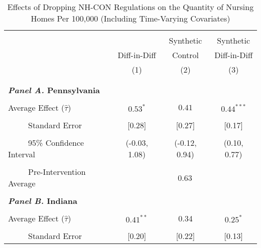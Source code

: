 \documentclass[12pt]{article}
\begin{document}
\vfill
\begin{table}[htbp]\centering \footnotesize
\def\sym#1{\ifmmode^{#1}\else\(^{#1}\)\fi}
\captionsetup{width=.69\textwidth}
\caption{\centering Effects of Dropping NH-CON Regulations on the Quantity of Nursing Homes Per 100,000 (Including Time-Varying Covariates)}
\label{tab:ave_results_q_nh_nobord_cov}
\setlength{\tabcolsep}{10pt}
\begin{tabular}{l*{3}{c}}
\hline\hline
\\[-2ex]
&\multicolumn{1}{c}{}&\multicolumn{1}{c}{Synthetic}&\multicolumn{1}{c}{Synthetic}\\
&\multicolumn{1}{c}{Diff-in-Diff}&\multicolumn{1}{c}{Control}&\multicolumn{1}{c}{Diff-in-Diff}\\
&\multicolumn{1}{c}{(1)}&\multicolumn{1}{c}{(2)}&\multicolumn{1}{c}{(3)}\\
\\[-2ex]
\hline
\\[-.1ex]
\multicolumn{4}{l}{\textbf{\textit{Panel A.} Pennsylvania}}\\
\\[-1.5ex]
\multicolumn{1}{l}{Average Effect ($\hat{\tau}$)}&   \multicolumn{1}{c}{$0.53^{*}$}&   \multicolumn{1}{c}{$0.41$}&  \multicolumn{1}{c}{$0.44^{***}$}\\
\\[-2ex]
\multicolumn{1}{l}{\ \ \ \ \ Standard Error}  &\multicolumn{1}{c}{[0.28]}&\multicolumn{1}{c}{[0.27]}&\multicolumn{1}{c}{[0.17]}\\
\\[-2ex]
\multicolumn{1}{l}{\ \ \ \ \ 95\% Confidence Interval}&   \multicolumn{1}{c}{(-0.03, 1.08)}&   \multicolumn{1}{c}{(-0.12, 0.94)}&   \multicolumn{1}{c}{(0.10, 0.77)}\\
\\[-2ex]
\multicolumn{1}{l}{\ \ \ \ \ Pre-Intervention Average}&   \multicolumn{3}{c}{0.63}\\
\\[-.1ex]
\multicolumn{4}{l}{\textbf{\textit{Panel B.} Indiana}}\\
\\[-1.5ex]
\multicolumn{1}{l}{Average Effect ($\hat{\tau}$)}&   \multicolumn{1}{c}{$0.41^{**}$}&   \multicolumn{1}{c}{0.34}&  \multicolumn{1}{c}{$0.25^{*}$}\\
\\[-2ex]
\multicolumn{1}{l}{\ \ \ \ \ Standard Error}  &\multicolumn{1}{c}{[0.20]}&\multicolumn{1}{c}{[0.22]}&\multicolumn{1}{c}{[0.13]}\\

\end{tabular}
\end{table}
\end{document}
